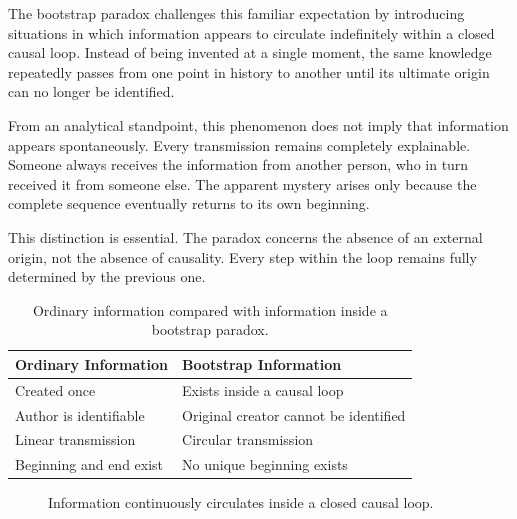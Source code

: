 \documentclass[12pt,oneside,openany]{book}
\begin{document}
The bootstrap paradox challenges this familiar expectation by introducing
situations in which information appears to circulate indefinitely within a
closed causal loop. Instead of being invented at a single moment, the same
knowledge repeatedly passes from one point in history to another until its
ultimate origin can no longer be identified.

From an analytical standpoint, this phenomenon does not imply that information
appears spontaneously. Every transmission remains completely explainable.
Someone always receives the information from another person, who in turn
received it from someone else. The apparent mystery arises only because the
complete sequence eventually returns to its own beginning.

This distinction is essential. The paradox concerns the absence of an external
origin, not the absence of causality. Every step within the loop remains fully
determined by the previous one.

\begin{table}[H]
\centering
\begin{tabular}{|p{4cm}|p{8cm}|}
\hline
\textbf{Ordinary Information} & \textbf{Bootstrap Information}\\
\hline
Created once & Exists inside a causal loop\\
\hline
Author is identifiable & Original creator cannot be identified\\
\hline
Linear transmission & Circular transmission\\
\hline
Beginning and end exist & No unique beginning exists\\
\hline
\end{tabular}
\caption{Ordinary information compared with information inside a bootstrap paradox.}
\end{table}

\begin{figure}[H]
\centering
{}
\caption{Information continuously circulates inside a closed causal loop.}
\end{figure}
\end{document}
